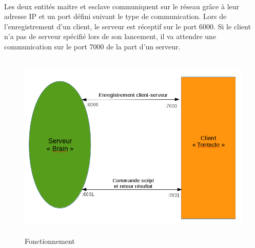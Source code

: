 \paragraph{}
Les deux entités maitre et esclave communiquent sur le réseau grâce à leur adresse IP et un port défini suivant le type de communication. Lors de l'enregistrement d'un client, le serveur est réceptif sur le port 6000. Si le client n'a pas de serveur spécifié lors de son lancement, il va attendre une communication sur le port 7000 de la part d'un serveur.
\begin{figure}[!h]
    \centering
    \includegraphics[width=\textwidth,height=9cm,keepaspectratio=true]{img/fct.png}
    \caption{Fonctionnement}
\end{figure}
